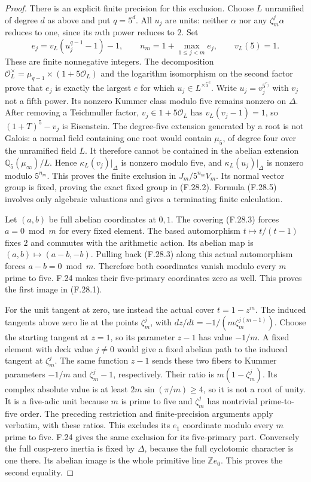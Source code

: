 \begin{proof}
There is an explicit finite precision for
this exclusion.  Choose $L$ unramified
of degree $d$ as above and put $q=5^d$.
All $u_j$ are units: neither
$\alpha$ nor any $\zeta_m^j\alpha$ reduces
to one, since its $m$th power reduces to
$2$.  Set
\[
 e_j=v_L(u_j^{q-1}-1)-1,\qquad
             n_m=1+\max_{1\le j<m}e_j,
       \qquad v_L(5)=1.                                   \tag{F.28.5}
\]
These are finite nonnegative integers.
The decomposition
$\mathcal O_L^\times=
 \mu_{q-1}\times(1+5\mathcal O_L)$
and the logarithm isomorphism on the
second factor prove that $e_j$ is
exactly the largest $e$ for which
$u_j\in L^{\times5^e}$.
Write $u_j=v_j^{5^{e_j}}$ with $v_j$
not a fifth power.  Its nonzero
Kummer class modulo five remains
nonzero on $\Delta$.
After removing a Teichmuller factor,
$v_j\in1+5\mathcal O_L$ has
$v_L(v_j-1)=1$, so
$(1+T)^5-v_j$ is Eisenstein.
The degree-five extension generated by
a root is not Galois: a normal field
containing one root would contain
$\mu_5$, of degree four over the
unramified field $L$.
It therefore cannot be contained in
the abelian extension
$\mathbb Q_5(\mu_\infty)/L$.
Hence $\kappa_L(v_j)|_\Delta$ is
nonzero modulo five, and
$\kappa_L(u_j)|_\Delta$ is nonzero
modulo $5^{n_m}$.
This proves the finite exclusion in
$J_m/5^{n_m}V_m$.
Its normal vector group is fixed,
proving the exact fixed group in
(F.28.2).  Formula (F.28.5) involves
only algebraic valuations and gives
a terminating finite calculation.

Let $(a,b)$ be full abelian coordinates
at $0,1$.  The covering (F.28.3) forces
$a=0\bmod m$ for every fixed element.
The based automorphism
$t\mapsto t/(t-1)$ fixes $2$ and
commutes with the arithmetic action.
Its abelian map is
$(a,b)\mapsto(a-b,-b)$.
Pulling back (F.28.3) along this
actual automorphism forces
$a-b=0\bmod m$.  Therefore both
coordinates vanish modulo every
$m$ prime to five.
F.24 makes their five-primary
coordinates zero as well.
This proves the first image in
(F.28.1).

For the unit tangent at zero, use
instead the actual cover
$t=1-z^m$.  The induced tangents
above zero lie at the points
$\zeta_m^j$, with
$dz/dt=-1/(m\zeta_m^{j(m-1)})$.
Choose the starting tangent at
$z=1$, so its parameter $z-1$
has value $-1/m$.
A fixed element with deck value
$j\ne0$ would give a fixed
abelian path to the induced
tangent at $\zeta_m^j$.
The same function $z-1$ sends
these two fibers to Kummer
parameters $-1/m$ and
$\zeta_m^j-1$, respectively.
Their ratio is
$m(1-\zeta_m^j)$.
Its complex absolute value is
at least
$2m\sin(\pi/m)\ge4$, so it
is not a root of unity.
It is a five-adic unit because
$m$ is prime to five and
$\zeta_m^j$ has nontrivial
prime-to-five order.
The preceding restriction and
finite-precision arguments apply
verbatim, with these ratios.
This excludes its $e_1$ coordinate
modulo every $m$ prime to five.
F.24 gives the same exclusion
for its five-primary part.
Conversely the full cusp-zero
inertia is fixed by $\Delta$,
because the full cyclotomic
character is one there.
Its abelian image is the
whole primitive line
$\widehat{\mathbb Z}e_0$.
This proves the second equality.


\end{proof}
